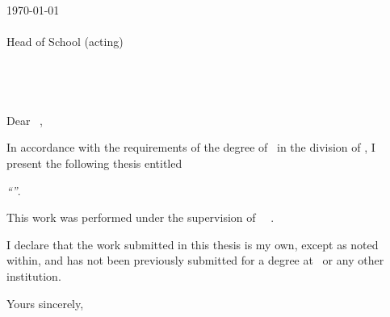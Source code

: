 \thispagestyle{plain}
\begin{flushright}
  \authorFirst\ \authorLast\\
  \medskip
  \authorContact
\end{flushright}

\vspace{3cm}
\today\vspace{1cm}\\
\headHonShort\ \headFirst\ \headLast\\
Head of School (acting)\\
\department\\
\institution\\
\location\\
\vspace{1cm}\\
Dear \headHonLong\ \headLast ,\medskip

In accordance with the requirements of the degree of \degree\ in the division of \major , I present the following thesis entitled \begin{center} \textit{``\documentTitle ''}. \end{center}  

This work was performed under the supervision of \superHon\ \superFirst\ \superLast .

I declare that the work submitted in this thesis is my own, except as noted within, and has not been previously submitted for a degree at \institution\ or any other institution.

\bigskip
\begin{flushright}
	Yours sincerely,\\
	\authorFirst\ \authorLast
\end{flushright}